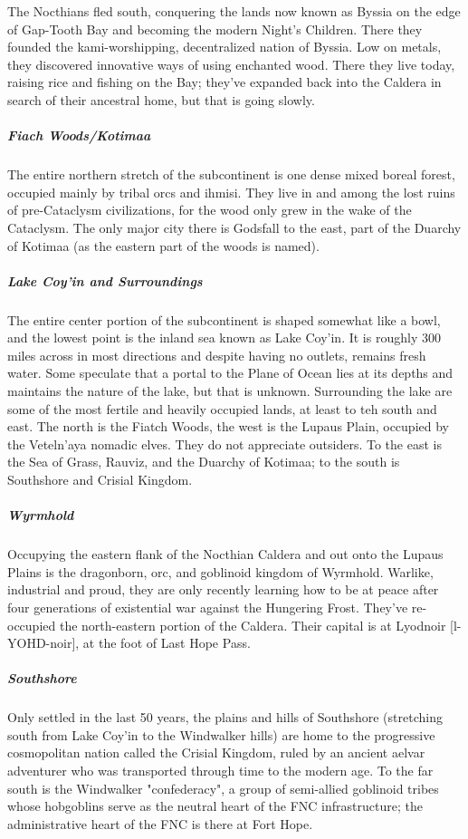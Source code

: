 The Nocthians fled south, conquering the lands now known as Byssia on the edge of Gap-Tooth Bay and becoming the modern Night's Children. There they founded the kami-worshipping, decentralized nation of Byssia. Low on metals, they discovered innovative ways of using enchanted wood. There they live today, raising rice and fishing on the Bay; they've expanded back into the Caldera in search of their ancestral home, but that is going slowly.

\subparagraph*{Fiach Woods/Kotimaa} The entire northern stretch of the subcontinent is one dense mixed boreal forest, occupied mainly by tribal orcs and ihmisi. They live in and among the lost ruins of pre-Cataclysm civilizations, for the wood only grew in the wake of the Cataclysm. The only major city there is Godsfall to the east, part of the Duarchy of Kotimaa (as the eastern part of the woods is named).

\subparagraph*{Lake Coy'in and Surroundings} The entire center portion of the subcontinent is shaped somewhat like a bowl, and the lowest point is the inland sea known as Lake Coy'in. It is roughly 300 miles across in most directions and despite having no outlets, remains fresh water. Some speculate that a portal to the Plane of Ocean lies at its depths and maintains the nature of the lake, but that is unknown. Surrounding the lake are some of the most fertile and heavily occupied lands, at least to teh south and east. The north is the Fiatch Woods, the west is the Lupaus Plain, occupied by the Veteln'aya nomadic elves. They do not appreciate outsiders. To the east is the Sea of Grass, Rauviz, and the Duarchy of Kotimaa; to the south is Southshore and Crisial Kingdom.

\subparagraph*{Wyrmhold} Occupying the eastern flank of the Nocthian Caldera and out onto the Lupaus Plains is the dragonborn, orc, and goblinoid kingdom of Wyrmhold. Warlike, industrial and proud, they are only recently learning how to be at peace after four generations of existential war against the Hungering Frost. They've re-occupied the north-eastern portion of the Caldera. Their capital is at Lyodnoir [l-YOHD-noir], at the foot of Last Hope Pass.

\subparagraph*{Southshore} Only settled in the last 50 years, the plains and hills of Southshore (stretching south from Lake Coy'in to the Windwalker hills) are home to the progressive cosmopolitan nation called the Crisial Kingdom, ruled by an ancient aelvar adventurer who was transported through time to the modern age. To the far south is the Windwalker "confederacy", a group of semi-allied goblinoid tribes whose hobgoblins serve as the neutral heart of the FNC infrastructure; the administrative heart of the FNC is there at Fort Hope.

